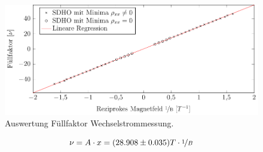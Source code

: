 \begin{figure}[h]
	\centering
	\includegraphics{graphs/ac/auswertung.pdf}
	\caption[Auswertung Füllfaktor Wechselstrommessung]{
		Auswertung Füllfaktor Wechselstrommessung.
	}
	\label{fig:ac_ausw}
\end{figure}

\begin{equation}
\nu= A\cdot x=(28.908\pm 0.035)T \cdot \nicefrac{1}{B}
\end{equation}